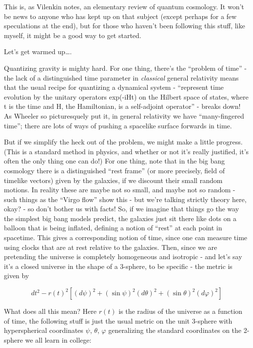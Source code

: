 \documentclass{article}
\begin{document}
This is, as Vilenkin notes, an elementary review of quantum cosmology.
It won't be news to anyone who has kept up on that subject (except
perhaps for a few speculations at the end), but for those who haven't
been following this stuff, like myself, it might be a good way to get
started.

Let's get warmed up\ldots.

Quantizing gravity is mighty hard. For one thing, there's the ``problem
of time'' - the lack of a distinguished time parameter in
\emph{classical} general relativity means that the usual recipe for
quantizing a dynamical system - ``represent time evolution by the
unitary operators exp(-iHt) on the Hilbert space of states, where t is
the time and H, the Hamiltonian, is a self-adjoint operator'' - breaks
down! As Wheeler so picturesquely put it, in general relativity we have
``many-fingered time''; there are lots of ways of pushing a spacelike
surface forwards in time.

But if we simplify the heck out of the problem, we might make a little
progress. (This is a standard method in physics, and whether or not it's
really justified, it's often the only thing one can do!) For one thing,
note that in the big bang cosmology there is a distinguished ``rest
frame'' (or more precisely, field of timelike vectors) given by the
galaxies, if we discount their small random motions. In reality these
are maybe not so small, and maybe not so random - such things as the
``Virgo flow'' show this - but we're talking strictly theory here, okay?
- so don't bother us with facts! So, if we imagine that things go the
way the simplest big bang models predict, the galaxies just sit there
like dots on a balloon that is being inflated, defining a notion of
``rest'' at each point in spacetime. This gives a corresponding notion
of time, since one can measure time using clocks that are at rest
relative to the galaxies. Then, since we are pretending the universe is
completely homogeneous and isotropic - and let's say it's a closed
universe in the shape of a 3-sphere, to be specific - the metric is
given by

\[dt^2 - r(t)^2[(d\psi)^2 + (\sin \psi)^2{(d\theta)^2 + (\sin \theta)^2 (d\varphi)^2}]\]

What does all this mean? Here \(r(t)\) is the radius of the universe as
a function of time, the following stuff is just the usual metric on the
unit 3-sphere with hyperspherical coordinates \(\psi\), \(\theta\),
\(\varphi\) generalizing the standard coordinates on the 2-sphere we all
learn in college:
\end{document}

